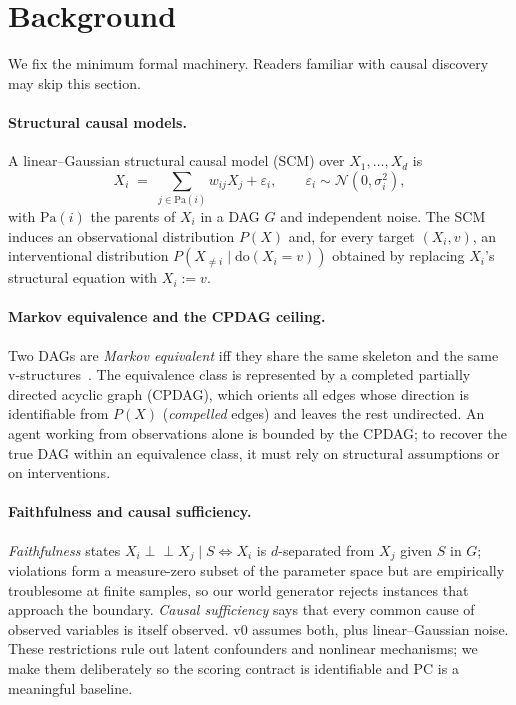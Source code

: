 \section{Background}
\label{sec:background}

We fix the minimum formal machinery. Readers familiar with causal discovery may skip this section.

\paragraph{Structural causal models.} A linear--Gaussian structural causal model (SCM) over $X_1, \dots, X_d$ is
\begin{equation}
X_i \;=\; \sum_{j \in \mathrm{Pa}(i)} w_{ij} X_j + \varepsilon_i,
\qquad \varepsilon_i \sim \mathcal{N}(0, \sigma^2_i),
\label{eq:linear-gaussian}
\end{equation}
with $\mathrm{Pa}(i)$ the parents of $X_i$ in a DAG $G$ and independent noise. The SCM induces an observational distribution $P(X)$ and, for every target $(X_i, v)$, an interventional distribution $P(X_{\neq i} \mid \mathrm{do}(X_i = v))$ obtained by replacing $X_i$'s structural equation with $X_i := v$.

\paragraph{Markov equivalence and the CPDAG ceiling.} Two DAGs are \emph{Markov equivalent} iff they share the same skeleton and the same v-structures~\citep{verma1990equivalence,andersson1997characterization}. The equivalence class is represented by a completed partially directed acyclic graph (CPDAG), which orients all edges whose direction is identifiable from $P(X)$ (\emph{compelled} edges) and leaves the rest undirected. An agent working from observations alone is bounded by the CPDAG; to recover the true DAG within an equivalence class, it must rely on structural assumptions or on interventions.

\paragraph{Faithfulness and causal sufficiency.} \emph{Faithfulness} states $X_i \perp\!\!\!\perp X_j \mid S \iff X_i$ is $d$-separated from $X_j$ given $S$ in $G$; violations form a measure-zero subset of the parameter space but are empirically troublesome at finite samples, so our world generator rejects instances that approach the boundary. \emph{Causal sufficiency} says that every common cause of observed variables is itself observed. v0 assumes both, plus linear--Gaussian noise. These restrictions rule out latent confounders and nonlinear mechanisms; we make them deliberately so the scoring contract is identifiable and PC is a meaningful baseline.

